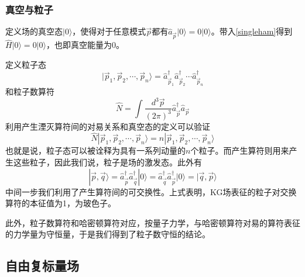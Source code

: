 \documentclass[a4paper,11pt]{ctexart}
\newcommand{\beq}{\begin{equation}}
\newcommand{\eeq}{\end{equation}}
\begin{document}
\subsubsection{真空与粒子}
定义场的真空态$|0\rangle$，使得对于任意模式$\vec{p}$都有$\hat{a}_{\vec{p}} |0\rangle = 0|0\rangle$。带入\cref{singleham}得到$\hat{H}|0\rangle = 0 |0\rangle$，也即真空能量为0。
\par
定义粒子态
\beq
|\vec{p}_1,\vec{p}_2,\cdots,\vec{p}_n\rangle = \hat{a}_{\vec{p}_1}^\dagger \hat{a}_{\vec{p}_2}^\dagger \cdots \hat{a}_{\vec{p}_n}^\dagger
\eeq
和粒子数算符
\beq
\hat{N} = \int \frac{d^3 \vec{p}}{(2\pi)^3} \hat{a}_{\vec{p}}^\dagger \hat{a}_{\vec{p}} 
\eeq
利用产生湮灭算符间的对易关系和真空态的定义可以验证
\beq
\hat{N} |\vec{p}_1,\vec{p}_2,\cdots,\vec{p}_n\rangle = n |\vec{p}_1,\vec{p}_2,\cdots,\vec{p}_n\rangle
\eeq
也就是说，粒子态可以被诠释为具有一系列动量的$n$个粒子。而产生算符则用来产生这些粒子，因此我们说，粒子是场的激发态。此外有
\beq
|\vec{p},\vec{q} \rangle = \hat{a}_{\vec{p}}^\dagger \hat{a}_{\vec{q}}^\dagger |0\rangle = \hat{a}_{\vec{q}}^\dagger \hat{a}_{\vec{p}}^\dagger |0\rangle = |\vec{q},\vec{p} \rangle
\eeq
中间一步我们利用了产生算符间的可交换性。上式表明，KG场表征的粒子对交换算符的本征值为1，为玻色子。
\par
此外，粒子数算符和哈密顿算符对应，按量子力学，与哈密顿算符对易的算符表征的力学量为守恒量，于是我们得到了粒子数守恒的结论。

\subsection{自由复标量场}
\end{document}
